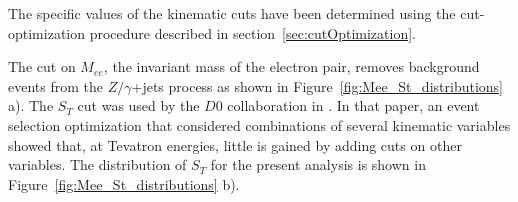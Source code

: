 The specific values of the kinematic cuts have been determined using the cut-optimization procedure
described in section~\ref{sec:cutOptimization}.

The cut on $M_{ee}$, the invariant mass of the electron pair, 
removes background events from the
$Z/\gamma$+jets process as shown in Figure~\ref{fig:Mee_St_distributions} a).
The $S_T$ cut was used by the $D0$ collaboration in 
\cite{Abazov:2001mx}. In that paper, an event 
selection optimization that considered
combinations of several kinematic variables 
showed that, at Tevatron energies, little is gained by 
adding cuts on other variables. The distribution of $S_T$ for the present
analysis is shown in Figure~\ref{fig:Mee_St_distributions} b).

